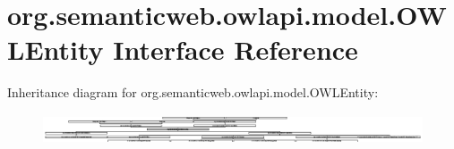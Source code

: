 \hypertarget{interfaceorg_1_1semanticweb_1_1owlapi_1_1model_1_1_o_w_l_entity}{\section{org.\-semanticweb.\-owlapi.\-model.\-O\-W\-L\-Entity Interface Reference}
\label{interfaceorg_1_1semanticweb_1_1owlapi_1_1model_1_1_o_w_l_entity}
}
Inheritance diagram for org.\-semanticweb.\-owlapi.\-model.\-O\-W\-L\-Entity\-:\begin{figure}[H]
\begin{center}
\leavevmode
\includegraphics[height=0.896205cm]{interfaceorg_1_1semanticweb_1_1owlapi_1_1model_1_1_o_w_l_entity}
\end{center}
\end{figure}
